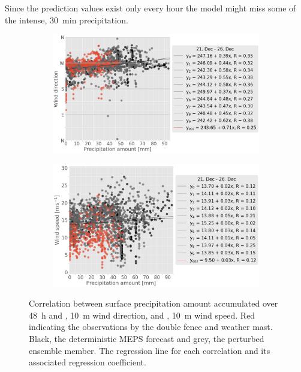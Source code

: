 Since the prediction values exist only every hour the model might miss some of the intense, \SI{30}{\minute} precipitation. %
\\
\begin{figure}[!ht]
	\centering
	\begin{subfigure}[b]{0.75\textwidth}
		\centering
		\includegraphics[width=\textwidth]{./fig_scat_PP/precip_vs_WD}
		\caption{}\label{fig:wind_precip:WD}
	\end{subfigure}
	\begin{subfigure}[b]{0.75\textwidth}
		\centering
		\includegraphics[width=\textwidth]{./fig_scat_PP/precip_vs_WS}
		\caption{}\label{fig:wind_precip:WS}
	\end{subfigure}
	\caption{Correlation between surface precipitation amount accumulated over \SI{48}{\hour} and \protect{}, \SI{10}{\meter} wind direction, and \protect{}, \SI{10}{\metre} wind speed. Red indicating the observations by the double fence and weather mast. Black, the deterministic MEPS forecast and grey, the perturbed ensemble member. The regression line for each correlation and its associated regression coefficient.}\label{fig:wind_precip}
\end{figure}
